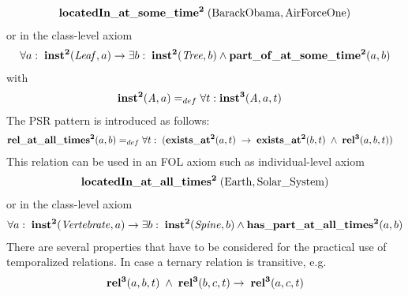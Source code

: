 \begin{equation}
\begin{split}
\mathrm{\mathbf{locatedIn\_at\_some\_time^2}} \;(\mathrm{BarackObama}, \mathrm{AirForceOne})  
\end{split}
\label{eq:personlocated}
\end{equation}
%
or in the class-level axiom
%
\begin{equation}
\begin{split}
\forall a:\; \mathrm{\mathbf{inst^2}}(\mathit{Leaf}, a) 
\rightarrow
\exists b:\;\mathrm{\mathbf{inst^2}}(\mathit{Tree}, b)
\wedge
\mathrm{\mathbf{part\_of\_at\_some\_time^2}}(a,b)  \end{split}
\label{eq:leaf}
\end{equation}
%
with 
%  
\begin{equation}
\begin{split}
\mathrm{\mathbf{inst^2}} (\mathit{A},a) =_{def}&\; \forall t: \mathrm{\mathbf{inst^3}}(\mathit{A},a,t)  
\end{split}
\label{eq:temporarily:inst}
\end{equation}
%
The PSR pattern is introduced as follows:  
%
\begin{equation}
\begin{split}
\mathrm{\mathbf{rel\_at\_all\_times^2}} (a,b) =_{def}&\;
\forall t: \; (\mathrm{\mathbf{exists\_at^2}} (a, t) \; \rightarrow \; \mathrm{\mathbf{exists\_at^2}} (b, t) \; \wedge \; \mathrm{\mathbf{rel^3}}(a,b,t))  
\end{split}
\label{eq:permanently:ind}
\end{equation}
%
This relation can be used in an FOL axiom such as individual-level axiom
%
\begin{equation}
\begin{split}
\mathrm{\mathbf{locatedIn\_at\_all\_times^2}} \;(\mathrm{Earth}, \mathrm{Solar\_System})  
\end{split}
\label{eq:earth}
\end{equation}
%
or in the class-level axiom
%
\begin{equation}
\begin{split}
\forall a:\; \mathrm{\mathbf{inst^2}}(\mathit{Vertebrate}, a) 
\rightarrow
\exists b:\;\mathrm{\mathbf{inst^2}}(\mathit{Spine}, b)
\wedge
\mathrm{\mathbf{has\_part\_at\_all\_times^2}}(a,b)  \end{split}
\label{eq:spine}
\end{equation}
%  
There are several properties that have to be considered for the practical use of temporalized relations. In case a ternary relation is transitive, e.g.  
%
\begin{equation}
\begin{split}
\mathrm{\mathbf{rel^3}}(a,b,t) \; \wedge \; \mathrm{\mathbf{rel^3}}(b,c,t) \rightarrow \; \mathrm{\mathbf{rel^3}}(a,c,t)   
\end{split}
\label{eq:trtrans}
\end{equation}    
